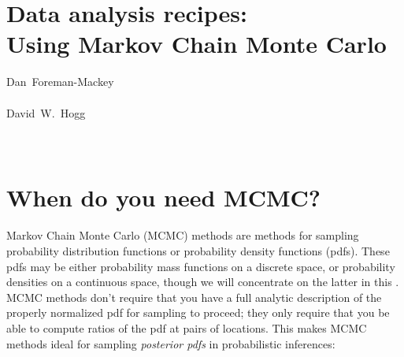 \documentclass[12pt,twoside,pdftex]{article}
\newcommand{\this}{Using Markov Chain Monte Carlo}
\begin{document}
\thispagestyle{plain}\sloppy\sloppypar\raggedbottom
\section*{Data analysis recipes:\\ \this\footnotemark}


\noindent
Dan~Foreman-Mackey\\
\\[1ex]
David~W.~Hogg\\
\\
\\

\begin{abstract}
Markov Chain Monte Carlo (MCMC) methods for sampling probability
distribution functions, plus abundant computational resources,
have transformed the sciences.
Here we give a fast overview of basic MCMC methods and then turn to
practical advice for their use in real inference problems.
We give advice on method choice, tuning for performance,
initialization and burn-in, judging convergence, and use of the chain
output to produce parameter estimates with associated uncertainties.
[Insert some generally useful point here!]
\end{abstract}

\section{When do you need MCMC?}

Markov Chain Monte Carlo (MCMC) methods are methods for sampling
probability distribution functions or probability density functions (pdfs).
These pdfs may be either probability mass functions on a discrete
space, or probability densities on a continuous space, though we will
concentrate on the latter in this \documentname.
MCMC methods don't require that you have a full analytic description of the
properly normalized pdf for sampling to proceed; they only require
that you be able to compute ratios of the pdf at pairs of locations.
This makes MCMC methods ideal for sampling \emph{posterior
  pdfs} in probabilistic inferences:
\end{document}
